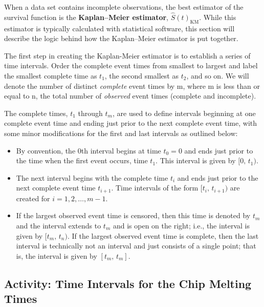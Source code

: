\documentclass[
]{book}
\providecommand{\tightlist}{%
  \setlength{\itemsep}{0pt}\setlength{\parskip}{0pt}}
\begin{document}
When a data set contains incomplete observations, the best estimator of the survival function is the \textbf{Kaplan--Meier estimator}, \(\hat S(t)_{\text{KM}}\). While this estimator is typically calculated with statistical software, this section will describe the logic behind how the Kaplan--Meier estimator is put together.

The first step in creating the Kaplan-Meier estimator is to establish a series of time intervals. Order the
complete event times from smallest to largest and label the smallest complete time as \(t_1\), the second smallest
as \(t_2\), and so on. We will denote the number of distinct \emph{complete} event times by m, where m is less than or
equal to n, the total number of \emph{observed} event times (complete and incomplete).

The complete times, \(t_1\) through \(t_m\), are used to define intervals beginning at one complete event time and
ending just prior to the next complete event time, with some minor modifications for the first and last intervals
as outlined below:

\begin{itemize}
\tightlist
\item
  By convention, the 0th interval begins at time \(t_0 = 0\) and ends just prior to the time when the first event occurs, time \(t_1\). This interval is given by \([0,\,t_1)\).
\item
  The next interval begins with the complete time \(t_i\) and ends just prior to the next complete event time \(t_{i+1}\). Time intervals of the form \([t_i,\,t_{i+1})\) are created for \(i = 1,2,\dots,m-1\).
\item
  If the largest observed event time is censored, then this time is denoted by \(t_m\) and the interval extends to \(t_m\) and is open on the right; i.e., the interval is given by \([t_m,\,t_n)\). If the largest observed event time is complete, then the last interval is technically not an interval and just consists of a single point; that is, the interval is given by \([t_m,\,t_m]\).
\end{itemize}

\hypertarget{activity-time-intervals-for-the-chip-melting-times}{%
\subsection*{Activity: Time Intervals for the Chip Melting Times}\label{activity-time-intervals-for-the-chip-melting-times}}
\end{document}
